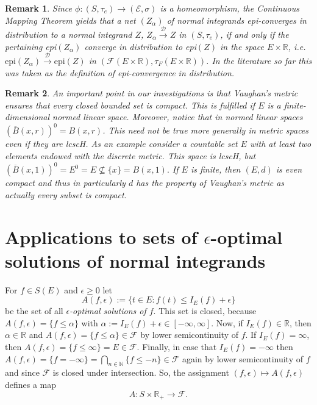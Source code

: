 \documentclass[sn-mathphys,Numbered]{sn-jnl}%
\theoremstyle{thmstyleone}%
\theoremstyle{thmstyletwo}%
\newtheorem{remark}{Remark}%
\theoremstyle{thmstylethree}%
\begin{document}
\begin{remark} \label{epiindistribution} Since $\phi: (S,\tau_e) \rightarrow (\mathcal{E},\sigma)$ is a homeomorphism, the Continuous Mapping Theorem yields that a net $(Z_\alpha)$ of normal integrands epi-converges in distribution to a normal
integrand $Z$, $Z_\alpha \stackrel{\mathcal{D}}{\rightarrow} Z$ in $(S,\tau_e)$, if and only if the pertaining epi$(Z_\alpha)$ converge in distribution to epi$(Z)$ in the space $E \times \mathbb{R}$, i.e.
$\text{epi}(Z_\alpha) \stackrel{\mathcal{D}}{\rightarrow} \text{epi}(Z)$ in $(\mathcal{F}(E \times \mathbb{R}), \tau_F(E \times \mathbb{R}))$.
In the literature so far this was taken as the definition of epi-convergence in distribution.
\end{remark}

\vspace{0.2cm}
\begin{remark} \label{interiorofclosedball} An important point in our investigations is that Vaughan's metric ensures that every closed bounded set is
compact. This is fulfilled if $E$ is a finite-dimensional normed linear space.
Moreover, notice that in normed linear spaces $(\overline{B}(x,r))^0=B(x,r)$. This need not be true more generally in metric spaces even if they are lcscH. As an example consider
a countable set $E$ with at least two elements endowed with the discrete metric. This space is lcscH, but $(\overline{B}(x,1))^0= E^0 =E \nsubseteq \{x\}= B(x,1).$ If $E$ is finite,
then $(E,d)$ is even compact and thus in particularly $d$ has the property of Vaughan's metric as actually every subset is compact.
\end{remark}

\section{Applications to sets of $\epsilon$-optimal solutions of normal integrands}
For $f \in S(E)$ and $\epsilon \ge 0$ let
$$
 A(f,\epsilon):=\{t \in E: f(t)\le I_E(f)+\epsilon\}
$$
be the set of all \emph{$\epsilon$-optimal solutions of $f$}. This set is closed, because $A(f,\epsilon)= \{f \le \alpha\}$ with $\alpha:= I_E(f)+\epsilon \in [-\infty,\infty]$. Now, if $I_E(f) \in \mathbb{R}$, then $\alpha \in \mathbb{R}$ and $A(f,\epsilon)=\{f \le \alpha\} \in \mathcal{F}$ by lower semicontinuity of $f$. If $I_E(f)= \infty$, then $A(f,\epsilon)=\{f \le \infty\}=E \in \mathcal{F}.$
Finally, in case that $I_E(f)=-\infty$ then $A(f,\epsilon)=\{f= -\infty\}= \bigcap_{n \in \mathbb{N}} \{f \le -n\} \in \mathcal{F}$ again by lower semicontinuity of $f$ and since $\mathcal{F}$ is closed under intersection.
So, the assignment $(f,\epsilon) \mapsto A(f,\epsilon)$ defines a map
\begin{equation} \label{Amap}
A:S \times \mathbb{R}_+ \rightarrow \mathcal{F}.
\end{equation}
\end{document}
